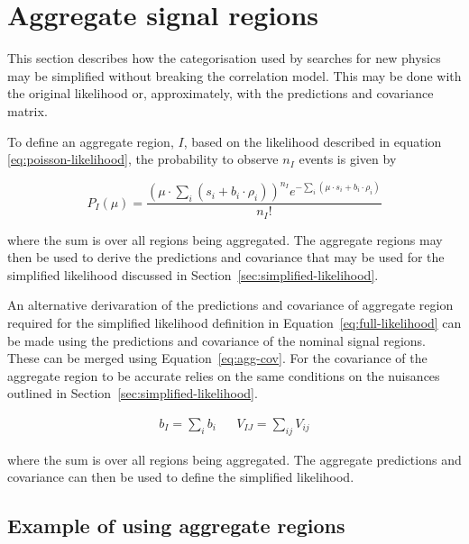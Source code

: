 \section{Aggregate signal regions}
\label{sec:aggregate-signal-regions}

This section describes how the categorisation used by searches for new
physics may be simplified without breaking the correlation model. 
This may be done with the original likelihood or, approximately,
with the predictions and covariance matrix.

To define an aggregate region, $I$, based on the likelihood described in equation
\ref{eq:poisson-likelihood}, the probability to observe $n_{I}$ events is given by

\begin{equation}
 P_{I}(\mu) = \dfrac{(\mu \cdot \sum_i(s_{i}+b_{i} \cdot \rho_{i}))^{n_{I}} e^{-\sum_i(\mu \cdot s_{i}+b_{i}\cdot\rho_{i})} }{n_{I}!}
\label{eq:agg-likelihood}
\end{equation}

where the sum is over all regions being aggregated. The aggregate regions
may then be used to derive the predictions and covariance that may be
used for the simplified likelihood discussed in 
Section~\ref{sec:simplified-likelihood}.

An alternative derivaration of the predictions and covariance of aggregate region 
required for the simplified likelihood definition in Equation~\ref{eq:full-likelihood} can
be made using the predictions and covariance of the nominal signal regions.
These can be merged using Equation~\ref{eq:agg-cov}. For the covariance of the aggregate
region to be accurate relies on the same conditions on the nuisances outlined 
in Section~\ref{sec:simplified-likelihood}. 

\begin{align}
b_{I} = \sum_i b_{i} && V_{IJ}=\sum_{ij}V_{ij}
\label{eq:agg-cov}
\end{align}

where the sum is over all regions being aggregated. The aggregate predictions
and covariance can then be used to define the simplified likelihood.

\subsection{Example of using aggregate regions}
\label{sec:agg-toy}


